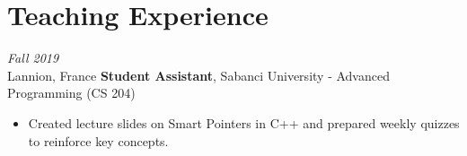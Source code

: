\section{Teaching Experience}

\begin{twocolentry}{
    \textit{Fall 2019}\\
    \small Lannion, France}
    \normalsize \textbf{Student Assistant}, \small {Sabanci University - Advanced Programming (CS 204)}
    \small 
    \begin{itemize}
        \item Created lecture slides on Smart Pointers in C++ and prepared weekly quizzes to reinforce key concepts.
    \end{itemize}
    
\end{twocolentry}